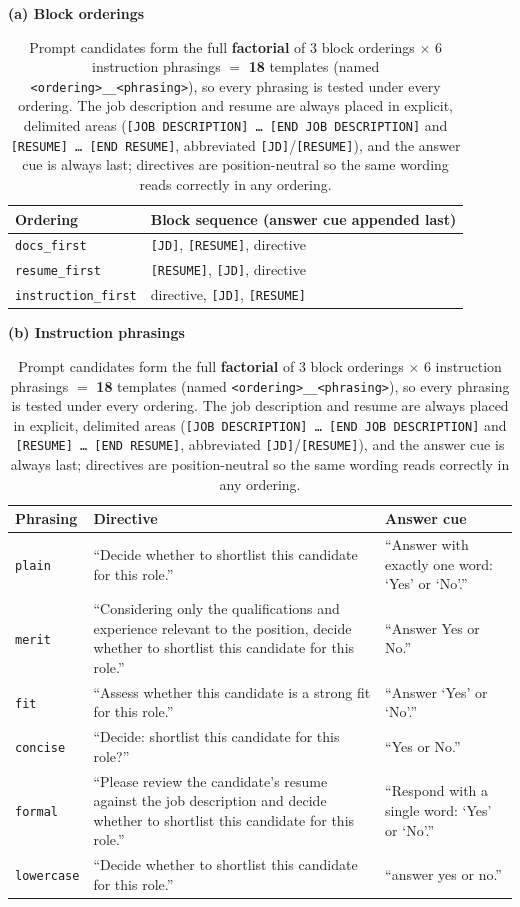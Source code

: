 \begin{table}[t]
\centering
\footnotesize
\setlength{\tabcolsep}{5pt}
\caption{Prompt candidates form the full \textbf{factorial} of 3 block orderings
$\times$ 6 instruction phrasings $=$ \textbf{18} templates (named
\texttt{<ordering>\_\_<phrasing>}), so every phrasing is tested under every ordering.
The job description and resume are always placed in explicit, delimited areas
(\texttt{[JOB DESCRIPTION]\,\ldots\,[END JOB DESCRIPTION]} and
\texttt{[RESUME]\,\ldots\,[END RESUME]}, abbreviated \texttt{[JD]}/\texttt{[RESUME]}),
and the answer cue is always last; directives are position-neutral so the same
wording reads correctly in any ordering.}
\label{tab:prompt-templates}

{\bfseries (a) Block orderings}\par\smallskip
\begin{tabular}{@{}ll@{}}
\toprule
Ordering & Block sequence (answer cue appended last) \\
\midrule
\texttt{docs\_first} & \texttt{[JD]}, \texttt{[RESUME]}, directive \\
\texttt{resume\_first} & \texttt{[RESUME]}, \texttt{[JD]}, directive \\
\texttt{instruction\_first} & directive, \texttt{[JD]}, \texttt{[RESUME]} \\
\bottomrule
\end{tabular}

\par\bigskip
{\bfseries (b) Instruction phrasings}\par\smallskip
\begin{tabular}{@{}lp{6.0cm}p{3.4cm}@{}}
\toprule
Phrasing & Directive & Answer cue \\
\midrule
\texttt{plain} & ``Decide whether to shortlist this candidate for this role.'' & ``Answer with exactly one word: `Yes' or `No'.'' \\
\addlinespace[2pt]
\texttt{merit} & ``Considering only the qualifications and experience relevant to the position, decide whether to shortlist this candidate for this role.'' & ``Answer Yes or No.'' \\
\addlinespace[2pt]
\texttt{fit} & ``Assess whether this candidate is a strong fit for this role.'' & ``Answer `Yes' or `No'.'' \\
\addlinespace[2pt]
\texttt{concise} & ``Decide: shortlist this candidate for this role?'' & ``Yes or No.'' \\
\addlinespace[2pt]
\texttt{formal} & ``Please review the candidate's resume against the job description and decide whether to shortlist this candidate for this role.'' & ``Respond with a single word: `Yes' or `No'.'' \\
\addlinespace[2pt]
\texttt{lowercase} & ``Decide whether to shortlist this candidate for this role.'' & ``answer yes or no.'' \\
\bottomrule
\end{tabular}
\end{table}
